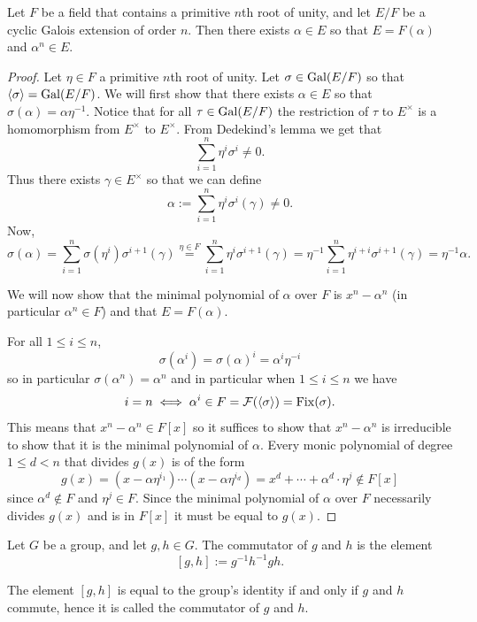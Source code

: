 \documentclass[11pt,a4paper]{article}
\begin{document}
\begin{theorem}
  Let $F$ be a field that contains a primitive $n$th root of unity,
  and let $E/F$ be a cyclic Galois extension of order $n$.
  Then there exists $\alpha \in E$ so that $E = F(\alpha)$
  and $\alpha^n \in E$.
\end{theorem}
\begin{proof}
  Let $\eta \in F$ a primitive $n$th root of unity.
  Let $\sigma \in \operatorname{Gal}(E/F)$ so that $\langle \sigma \rangle = \operatorname{Gal}(E/F)$.
  We will first show that there exists $\alpha \in E$
  so that $\sigma(\alpha) = \alpha \eta^{-1}$.
  Notice that for all $\tau \in \operatorname{Gal}(E/F)$ the restriction of $\tau$
  to $E^{\times}$ is a homomorphism from $E^{\times}$ to $E^{\times}$.
  From Dedekind's lemma we get that
  \[
    \sum_{i=1}^{n} \eta^i \sigma^i \neq 0.
  \]
  Thus there exists $\gamma \in E^{\times}$ so that we can define
  \[
    \alpha :=
    \sum_{i=1}^{n} \eta^i \sigma^i(\gamma) \neq 0.
  \]
  Now,
  \[
    \sigma(\alpha) =
    \sum_{i=1}^{n} \sigma(\eta^i) \sigma^{i+1}(\gamma) \overset{\eta \in F}{=}
    \sum_{i=1}^{n} \eta^i \sigma^{i+1}(\gamma) =
    \eta^{-1} \sum_{i=1}^{n} \eta^{i + i} \sigma^{i+1}(\gamma) =
    \eta^{-1} \alpha.
  \]

  We will now show that the minimal polynomial of $\alpha$ over $F$
  is $x^n - \alpha^n$ (in particular $\alpha^n \in F$)
  and that $E = F(\alpha)$.
  
  For all $1 \le i \le n$,
  \[
    \sigma(\alpha^i) =
    \sigma(\alpha)^i =
    \alpha^{i} \eta^{-i}
  \]
  so in particular $\sigma(\alpha^n) = \alpha^n$
  and in particular when $1 \le i \le n$ we have
  \[
    i = n \iff
    \alpha^i \in F = \mathcal F(\langle \sigma \rangle) = \mathrm{Fix}(\sigma).
  \]
  This means that $x^n - \alpha^n \in F[x]$ so it suffices to show
  that $x^n - \alpha^n$ is irreducible to show that it is the minimal
  polynomial of $\alpha$.
  Every monic polynomial of degree $1 \le d < n$ that divides $g(x)$
  is of the form
  \[
    g(x) =
    (x - \alpha \eta^{i_1}) \cdots (x - \alpha \eta^{i_d}) =
    x^d + \cdots + \alpha^d \cdot \eta^j \notin F[x]
  \]
  since $\alpha^d \notin F$ and $\eta^j \in F$.
  Since the minimal polynomial of $\alpha$ over $F$
  necessarily divides $g(x)$ and is in $F[x]$
  it must be equal to $g(x)$.
\end{proof}

\begin{definition}[Commutator]
  Let $G$ be a group, and let $g,h \in G$.
  The commutator of $g$ and $h$ is
  the element
  \[
    [g,h] := g^{-1} h^{-1} g h.
  \]
\end{definition}
\begin{remark}
  The element $[g,h]$ is equal to the group's
  identity if and only if $g$ and $h$ commute,
  hence it is called the commutator of $g$ and $h$.
\end{remark}
\end{document}
